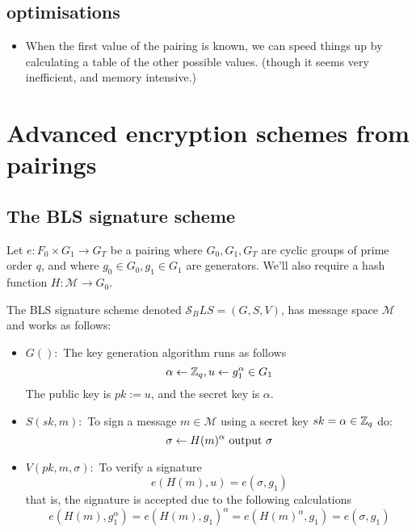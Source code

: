 \subsection*{optimisations}
\begin{itemize}
  \item When the first value of the pairing is known, we can speed things up
  by calculating a table of the other possible values. (though it seems very inefficient, and memory intensive.)
\end{itemize}

\section{Advanced encryption schemes from pairings}

\subsection{The BLS signature scheme}
Let $e:F_0 \times G_1 \to G_T$ be a pairing where $G_0,G_1,G_T$ are
cyclic groups of prime order $q$, and where $g_0\in G_0, g_1\in G_1$ are
generators. 
We'll also require a hash function $H : \mathcal{M} \to G_0$.

The BLS signature scheme denoted $\mathcal{S}_BLS = (G,S,V)$, has message space
$\mathcal{M}$ and works as follows:
\begin{itemize}
  \item $G():$ The key generation algorithm runs as follows 
  $$  \alpha \leftarrow \mathbb{Z}_q,u\leftarrow g_1^\alpha \in G_1  $$
  The public key is $ pk := u$, and the secret key is $\alpha$.

  \item $S(sk,m):$ To sign a message $m\in \mathcal{M}$ using a secret key
  $sk=\alpha\in\mathbb{Z}_q$ do:
  $$ \sigma\leftarrow H(m)^{\alpha} \text{ output } \sigma$$

  \item $V(pk,m,\sigma):$ To verify a signature 
  $$ e(H(m), u) = e(\sigma,g_1) $$
  that is, the signature is accepted due to the following calculations
  $$e(H(m), g_1^\alpha) = e(H(m),g_1)^\alpha = e(H(m)^\alpha,g_1)= 
  e(\sigma, g_1)
  $$
\end{itemize}

